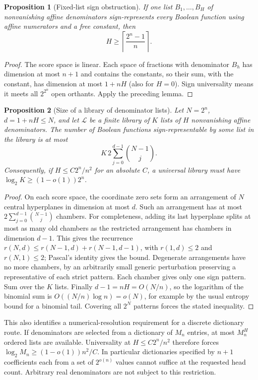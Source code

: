 \documentclass[11pt]{article}
\newtheorem{proposition}{Proposition}
\begin{document}
\begin{proposition}[Fixed-list sign obstruction]
If one list $B_1,\ldots,B_H$ of nonvanishing affine denominators
sign-represents every Boolean function using affine numerators and
a free constant, then
\[
 H\ge\left\lceil\frac{2^n-1}{n}\right\rceil.
\]
\end{proposition}
\begin{proof}
The score space is linear. Each space of fractions with denominator
$B_h$ has dimension at most $n+1$ and contains the constants, so their
sum, with the constant, has dimension at most $1+nH$ (also for $H=0$).
Sign universality means it meets all $2^{2^n}$ open orthants. Apply
the preceding lemma.
\end{proof}

\begin{proposition}[Size of a library of denominator lists]
Let $N=2^n$, $d=1+nH\le N$, and let $\mathcal L$ be a finite library
of $K$ lists of $H$ nonvanishing affine denominators. The number of
Boolean functions sign-representable by some list in the library is
at most
\[
 K\,2\sum_{j=0}^{d-1}\binom{N-1}{j}.
\]
Consequently, if $H\le C2^n/n^2$ for an absolute $C$, a universal
library must have $\log_2 K\ge(1-o(1))2^n$.
\end{proposition}
\begin{proof}
On each score space, the coordinate zero sets form an arrangement
of $N$ central hyperplanes in dimension at most $d$. Such an
arrangement has at most $2\sum_{j=0}^{d-1}\binom{N-1}{j}$ chambers.
For completeness, adding its last hyperplane splits at most as many
old chambers as the restricted arrangement has chambers in dimension
$d-1$. This gives the recurrence $r(N,d)\le r(N-1,d)+r(N-1,d-1)$,
with $r(1,d)\le2$ and $r(N,1)\le2$; Pascal's identity gives the bound.
Degenerate arrangements have no more chambers, by an arbitrarily small
generic perturbation preserving a representative of each strict pattern.
Each chamber gives only one sign pattern. Sum over the $K$ lists.
Finally $d-1=nH=O(N/n)$, so the logarithm of the binomial sum is
$O((N/n)\log n)=o(N)$, for example by the usual entropy bound for a
binomial tail. Covering all $2^N$ patterns forces the stated inequality.
\end{proof}

This also identifies a numerical-resolution requirement for a discrete
dictionary route. If denominators are selected from a dictionary of
$M_n$ entries, at most $M_n^H$ ordered lists are available. Universality
at $H\le C2^n/n^2$ therefore forces
$\log_2 M_n\ge(1-o(1))n^2/C$.
In particular dictionaries specified by $n+1$ coefficients each from
a set of $2^{o(n)}$ values cannot suffice at the requested head count.
Arbitrary real denominators are not subject to this restriction.
\end{document}
